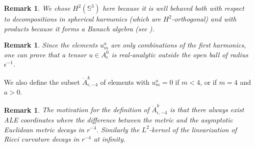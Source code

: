 \documentclass[12pt]{article}
\newtheorem{rem}[thm]{Remark}
\begin{document}
    \begin{rem}
        We chose $H^2(\mathbb{S}^3)$ here because it is well behaved both with respect to decompositions in spherical harmonics (which are $H^2$-orthogonal) and with products because it forms a Banach algebra (see \cite{pal}).
    \end{rem}
    \begin{rem}
        Since the elements $u_m^a$ are only combinations of the first harmonics, one can prove that a tensor $u\in A_\epsilon^0$ is real-analytic outside the \emph{open} ball of radius $\epsilon^{-1}$. 
    \end{rem}
 
    We also define the subset $\mathring{A}_{\epsilon,-4}^k$ of elements with $u_m^a= 0$ if $m<4$, or if $m=4$ and $a>0$.
    \begin{rem}
        The motivation for the definition of $\mathring{A}_{\epsilon,-4}^k$ is that there always exist ALE coordinates where the difference between the metric and the asymptotic Euclidean metric decays in $r^{-4}$. Similarly the $L^2$-kernel of the linearization of Ricci curvature decays in $r^{-4}$ at infinity.
    \end{rem}
    
\end{document}
